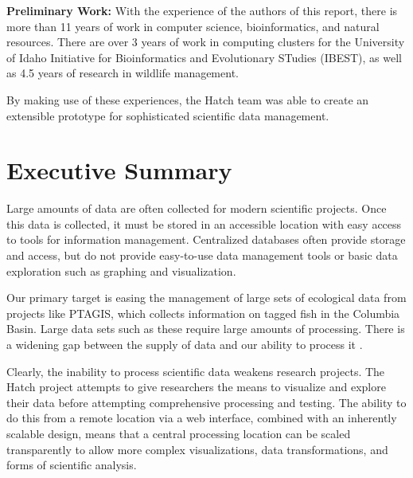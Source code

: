 \documentclass[12pt,letterpaper]{scrartcl}
\begin{document}
\textbf{Preliminary Work:} With the experience of the authors of this report, there is more than 11 
years of work in computer science, bioinformatics, and natural resources. There are over 3 years of 
work in computing clusters for the University of Idaho Initiative for Bioinformatics and 
Evolutionary STudies (IBEST), as well as 4.5 years of research in wildlife management.

By making use of these experiences, the Hatch team was able to create an extensible prototype for 
sophisticated scientific data management.

\thispagestyle{empty}

\pagebreak

\maketitle

\thispagestyle{empty}

\pagebreak

\thispagestyle{empty}
\tableofcontents
\listoffigures

\pagebreak

\doublespacing

\section{Executive Summary}
Large amounts of data are often collected for modern scientific projects.  Once this data is 
collected, it must be stored in an accessible location with easy access to tools for information 
management.  Centralized databases often provide storage and access, but do not provide easy-to-use 
data management tools or basic data exploration such as graphing and visualization.

Our primary target is easing the management of large sets of ecological data from projects like 
PTAGIS, which collects information on tagged fish in the Columbia Basin.  Large data sets such as
these require large amounts of processing.  There is a widening gap between the supply of data
and our ability to process it \cite{gordon_moore}.

Clearly, the inability to process scientific data weakens research projects.  The Hatch project
attempts to give researchers the means to visualize and explore their data before attempting
comprehensive processing and testing.  The ability to do this from a remote location via a
web interface, combined with an inherently scalable design, means that a central processing location 
can be scaled transparently to allow more complex visualizations, data transformations, and
forms of scientific analysis.
\end{document}
